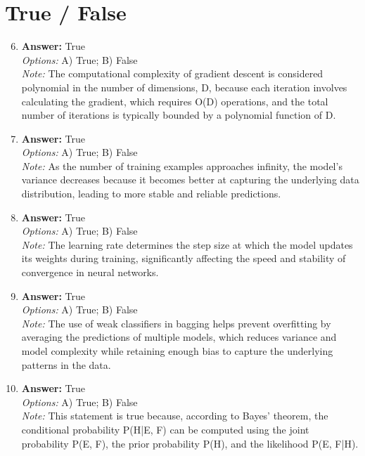 \documentclass[12pt]{article}
\begin{document}
\section*{True / False}
\begin{enumerate}[label=\arabic*.]
\setcounter{enumi}{5}
\item \textbf{Answer:} True
\\ \textit{Options:} A) True; B) False
\\ \textit{Note:} The computational complexity of gradient descent is considered polynomial in the number of dimensions, D, because each iteration involves calculating the gradient, which requires O(D) operations, and the total number of iterations is typically bounded by a polynomial function of D.
\item \textbf{Answer:} True
\\ \textit{Options:} A) True; B) False
\\ \textit{Note:} As the number of training examples approaches infinity, the model's variance decreases because it becomes better at capturing the underlying data distribution, leading to more stable and reliable predictions.
\item \textbf{Answer:} True
\\ \textit{Options:} A) True; B) False
\\ \textit{Note:} The learning rate determines the step size at which the model updates its weights during training, significantly affecting the speed and stability of convergence in neural networks.
\item \textbf{Answer:} True
\\ \textit{Options:} A) True; B) False
\\ \textit{Note:} The use of weak classifiers in bagging helps prevent overfitting by averaging the predictions of multiple models, which reduces variance and model complexity while retaining enough bias to capture the underlying patterns in the data.
\item \textbf{Answer:} True
\\ \textit{Options:} A) True; B) False
\\ \textit{Note:} This statement is true because, according to Bayes' theorem, the conditional probability P(H|E, F) can be computed using the joint probability P(E, F), the prior probability P(H), and the likelihood P(E, F|H).
\end{enumerate}
\end{document}
